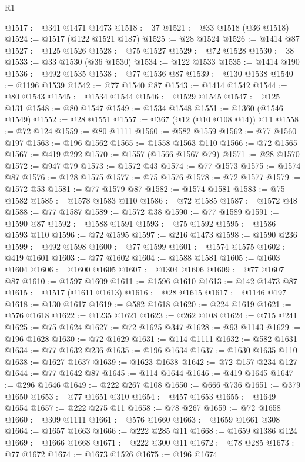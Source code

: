 \begin{lexlean}{R1}
\begin{coremodule}
@1517 := @341 @1471 @1473
@1518 := 37
@1521 := @33 @1518 (@36 @1518)
@1524 := @1517 (@122 @1521 @187)
@1525 := @28 @1524
@1526 := @1414 @87
@1527 := @125 @1526
@1528 := @75 @1527
@1529 := @72 @1528
@1530 := 38
@1533 := @33 @1530 (@36 @1530)
@1534 := @122 @1533
@1535 := @1414 @190
@1536 := @492 @1535
@1538 := @77 @1536 @87
@1539 := @130 @1538
@1540 := @1196 @1539
@1542 := @77 @1540 @87
@1543 := @1414 @1542
@1544 := @80 @1543
@1545 := @1534 @1544
@1546 := @1529 @1545
@1547 := @125 @131
@1548 := @80 @1547
@1549 := @1534 @1548
@1551 := @1360 (@1546 @1549)
@1552 := @28 @1551
@1557 := @367 (@12 (@10 @108 @14)) @11
@1558 := @72 @124
@1559 := @80 @1111
@1560 := @582 @1559
@1562 := @77 @1560 @197
@1563 := @196 @1562
@1565 := @1558 @1563 @110
@1566 := @72 @1565
@1567 := @419 @292
@1570 := @1557 (@1566 @1567 @79)
@1571 := @28 @1570
@1572 := @947 @79
@1573 := @1572 @43
@1574 := @77 @1573
@1575 := @1574 @87
@1576 := @128 @1575
@1577 := @75 @1576
@1578 := @72 @1577
@1579 := @1572 @53
@1581 := @77 @1579 @87
@1582 := @1574 @1581
@1583 := @75 @1582
@1585 := @1578 @1583 @110
@1586 := @72 @1585
@1587 := @1572 @48
@1588 := @77 @1587
@1589 := @1572 @38
@1590 := @77 @1589
@1591 := @1590 @87
@1592 := @1588 @1591
@1593 := @75 @1592
@1595 := @1586 @1593 @110
@1596 := @72 @1595
@1597 := @216 @1473
@1598 := @1590 @236
@1599 := @492 @1598
@1600 := @77 @1599
@1601 := @1574 @1575
@1602 := @419 @1601
@1603 := @77 @1602
@1604 := @1588 @1581
@1605 := @1603 @1604
@1606 := @1600 @1605
@1607 := @1304 @1606
@1609 := @77 @1607 @87
@1610 := @1597 @1609
@1611 := @1596 @1610
@1613 := @142 @1473 @87
@1615 := @1517 (@1611 @1613)
@1616 := @28 @1615
@1617 := @1146 @197
@1618 := @130 @1617
@1619 := @582 @1618
@1620 := @224 @1619
@1621 := @576 @1618
@1622 := @1235 @1621
@1623 := @262 @108
@1624 := @715 @241
@1625 := @75 @1624
@1627 := @72 @1625 @347
@1628 := @93 @1143
@1629 := @196 @1628
@1630 := @72 @1629
@1631 := @114 @1111
@1632 := @582 @1631
@1634 := @77 @1632 @236
@1635 := @196 @1634
@1637 := @1630 @1635 @110
@1638 := @1627 @1637
@1639 := @1623 @1638
@1642 := @72 @157 @234 @127
@1644 := @77 @1642 @87
@1645 := @114 @1644
@1646 := @419 @1645
@1647 := @296 @1646
@1649 := @222 @267 @108
@1650 := @666 @736
@1651 := @379 @1650
@1653 := @77 @1651 @310
@1654 := @457 @1653
@1655 := @1649 @1654
@1657 := @222 @275 @11
@1658 := @78 @267
@1659 := @72 @1658
@1660 := @309 @1111
@1661 := @576 @1660
@1663 := @1659 @1661 @308
@1664 := @1657 @1663
@1666 := @222 @285 @11
@1668 := @1659 @1386 @124
@1669 := @1666 @1668
@1671 := @222 @300 @11
@1672 := @78 @285
@1673 := @77 @1672
@1674 := @1673 @1526
@1675 := @196 @1674

\end{coremodule}
\end{lexlean}
